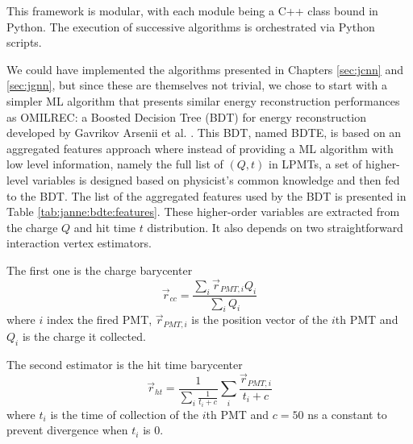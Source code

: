 \documentclass[../main.tex]{subfiles}
\begin{document}
This framework is modular, with each module being a C++ class bound in Python. The execution of successive algorithms is orchestrated via Python scripts.


We could have implemented the algorithms presented in Chapters \ref{sec:jcnn} and \ref{sec:jgnn}, but since these are themselves not trivial, we chose to start with a simpler ML algorithm that presents similar energy reconstruction performances as OMILREC: a Boosted Decision Tree (BDT) for energy reconstruction developed by Gavrikov Arsenii et al. \cite{gavrikov_energy_2022}.
This BDT, named BDTE, is based on an aggregated features approach where instead of providing a ML algorithm with low level information, namely the full list of $(Q,t)$ in LPMTs, a set of higher-level variables is designed based on physicist's common knowledge and then fed to the BDT. The list of the aggregated features used by the BDT is presented in Table \ref{tab:janne:bdte:features}. These higher-order variables are extracted from the charge $Q$ and hit time $t$ distribution. It also depends on two straightforward interaction vertex estimators.


The first one is the charge barycenter
\begin{equation}
  \label{eq:janne:bdte:cc}
  \vec{r}_{cc} = \frac{\sum_i \vec{r}_{PMT,i} Q_i}{\sum_i Q_i}
\end{equation}
where $i$ index the fired PMT, $\vec{r}_{PMT, i}$ is the position vector of the $i$th PMT and $Q_i$ is the charge it collected.

The second estimator is the hit time barycenter
\begin{equation}
  \label{eq:janne:bdt:cht}
  \vec{r}_{ht} = \frac{1}{\sum_i \frac{1}{t_i + c}} \sum_i \frac{\vec{r}_{PMT, i}}{t_i + c}
\end{equation}
where $t_i$ is the time of collection of the $i$th PMT and $c = 50$ ns a constant to prevent divergence when $t_i$ is 0.
\end{document}
